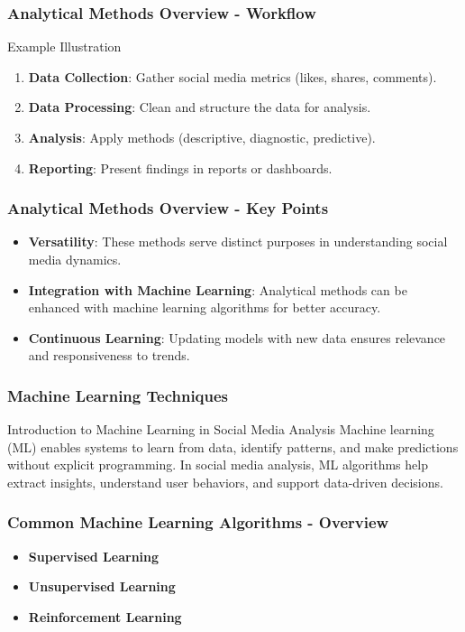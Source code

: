 \documentclass{beamer}
\begin{document}
\begin{frame}[fragile]
    \frametitle{Analytical Methods Overview - Workflow}
    \begin{block}{Example Illustration}
        \begin{enumerate}
            \item \textbf{Data Collection}: Gather social media metrics (likes, shares, comments).
            \item \textbf{Data Processing}: Clean and structure the data for analysis.
            \item \textbf{Analysis}: Apply methods (descriptive, diagnostic, predictive).
            \item \textbf{Reporting}: Present findings in reports or dashboards.
        \end{enumerate}
    \end{block}
\end{frame}

\begin{frame}[fragile]
    \frametitle{Analytical Methods Overview - Key Points}
    \begin{itemize}
        \item \textbf{Versatility}: These methods serve distinct purposes in understanding social media dynamics.
        \item \textbf{Integration with Machine Learning}: Analytical methods can be enhanced with machine learning algorithms for better accuracy.
        \item \textbf{Continuous Learning}: Updating models with new data ensures relevance and responsiveness to trends.
    \end{itemize}
\end{frame}

\begin{frame}[fragile]
    \frametitle{Machine Learning Techniques}
    \begin{block}{Introduction to Machine Learning in Social Media Analysis}
        Machine learning (ML) enables systems to learn from data, identify patterns, and make predictions without explicit programming.
        In social media analysis, ML algorithms help extract insights, understand user behaviors, and support data-driven decisions.
    \end{block}
\end{frame}

\begin{frame}[fragile]
    \frametitle{Common Machine Learning Algorithms - Overview}
    \begin{itemize}
        \item \textbf{Supervised Learning}
        \item \textbf{Unsupervised Learning}
        \item \textbf{Reinforcement Learning}
    \end{itemize}
\end{frame}
\end{document}
